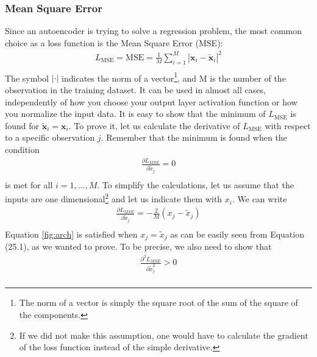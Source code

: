 \documentclass[12pt,a4]{article}
\begin{document}
\subsubsection{Mean Square Error}

Since an autoencoder is trying to solve a regression problem, the most common choice as a loss function is the Mean Square Error (MSE):
\begin{equation}
\begin{split}
L_{\textrm{MSE}} = \textrm{MSE} = \frac{1}{M}\sum_{i = 1}^{M}\left\vert\mathbf{x}_{i}-\tilde{\mathbf{x}}_{i}\right\vert^{2} \\ 
\end{split}
\end{equation}
The symbol \( \vert \cdot\vert\) indicates the norm of a vector\footnote{ The norm of a vector is simply the square root of the sum of the square of the components.}, and M is the number of the observation in the training dataset. It can be used in almost all cases, independently of how you choose your output layer activation function or how you normalize the input data. 
It is easy to show that the minimum of \( L_{\textrm{MSE}}\) is found for \(\tilde{\mathbf{x}}_{i} =\mathbf{x}_{i}\). To prove it, let us calculate the derivative of \( L_{\textrm{MSE}}\) with respect to a specific observation \( j.\) Remember that the minimum is found when the condition
\begin{equation}
\begin{split}
\frac{\partial L_{MSE}}{\partial\tilde{x}_{j}} = 0 \\ 
\end{split}
\end{equation}
is met for all \( i = 1,\ldots ,M\). To simplify the calculations, let us assume that the inputs are one dimensional\footnote{ If we did not make this assumption, one would have to calculate the gradient of the loss function instead of the simple derivative.} and let us indicate them with \( x_{i}\). We can write
\begin{equation}
\begin{split}
\frac{\partial L_{MSE}}{\partial\tilde{x}_{j}} =  -\frac{2}{M}\left(x_{j}-\tilde{x}_{j}\right) \\ 
\end{split}
\end{equation}
Equation \ref{fig:arch} is satisfied when \( x_{j} =\tilde{x}_{j}\) as can be easily seen from Equation (25.1), as we wanted to prove. To be precise, we also need to show that
\begin{equation}
\begin{split}
\frac{\partial^{2}L_{MSE}}{\partial\tilde{x}_{j}^{2}}>0 \\ 
\end{split}
\end{equation}
\end{document}
